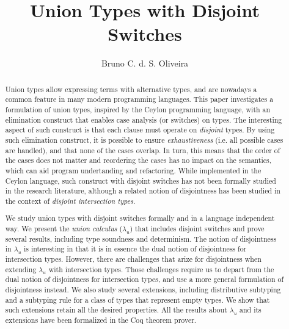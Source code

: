 \documentclass[acmsmall,review,anonymous,screen]{acmart}\settopmatter{printfolios=true,printccs=false,printacmref=false}
\title{Union Types with Disjoint Switches}
\author{Bruno C. d. S. Oliveira}
\affiliation{
  \institution{The University of Hong Kong}            %
}
\newcommand{\name}{$\lambda_{u}$\xspace}
\newcommand{\cal}{$\lambda_{u}$\xspace}
\begin{document}
\begin{abstract}
Union types allow expressing terms with alternative types, 
and are nowadays a common feature in many modern programming
languages.
This paper investigates a formulation of union types,
inspired by the Ceylon programming language, with an elimination
construct that enables case analysis (or switches) on types.  The
interesting aspect of such construct is that each clause must operate
on \emph{disjoint} types. By using such elimination construct, it is
possible to ensure \emph{exhaustiveness} (i.e. all possible cases are
handled), and that none of the cases overlap. In turn, this means that
the order of the cases does not matter and reordering the cases has no
impact on the semantics, which can aid program undertanding and
refactoring. While implemented in the Ceylon language, such construct
with disjoint switches has not been formally studied in the research
literature, although a related notion of disjointness has been studied
in the context of \emph{disjoint intersection types}.

We study union types with disjoint switches formally and in a language
independent way.  We present the \emph{union calculus} (\cal) that
includes disjoint switches and prove several results, including type
soundness and determinism. The notion of disjointness in \cal 
is interesting in that it is in essence the dual notion of disjointness
for intersection types.  However, there are challenges that arize for
disjointness when extending \name with intersection types. Those challenges
require us to depart from the dual notion of disjointness for intersection types,
and use a more general formulation of disjointness instead. We also
study several extensions, including 
distributive subtyping and a subtyping rule for a class of types that represent empty
types. We show that such extensions retain all the
desired properties. All the results about \cal and its extensions have
been formalized in the Coq theorem prover.
\end{abstract}

\begin{comment}
    With advance types
such as intersection types and union types, it has become a challenge
to define a robust, type-safe, coherent and deterministic type
system. One often has to compromise on one property to attain
another. Union types with pattern matching on types add significant
expressive power in programming language. Function overloading can
simply be expressed in a single function with the help of union types
and case analysis on types. Intersection types incorporate many
interesting and advance features that are not easy to implement in
classical OOP model.  This study proposes a novel calculus with all
aforementioned properties for pattern matching with union types and
intersection types. The calculus proposed in this study is named as
\cal.  Outline idea in \cal is to allow only non-overlapping or
disjoint types in case expressions.
\end{comment}
\end{document}
